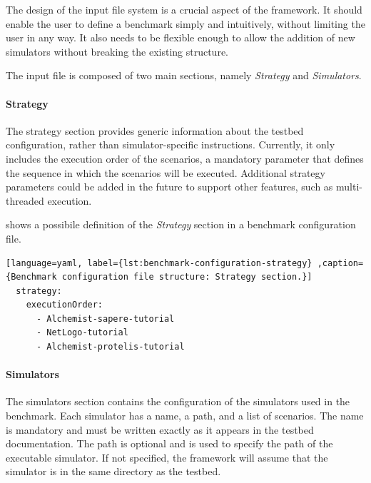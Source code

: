\documentclass[12pt,a4paper,openright,twoside]{book}
\begin{document}
The design of the input file system is a crucial aspect of the framework.
It should enable the user to define a benchmark simply and intuitively, without limiting the user in any way.
It also needs to be flexible enough to allow the addition of new simulators without breaking the existing structure.

The input file is composed of two main sections, namely \emph{Strategy} and \emph{Simulators}.

\paragraph*{Strategy}
The strategy section provides generic information about the testbed configuration, rather than simulator-specific instructions.
Currently, it only includes the execution order of the scenarios, a mandatory parameter that defines the sequence in which the scenarios will be executed.
Additional strategy parameters could be added in the future to support other features, such as multi-threaded execution.

 shows a possibile definition of the \emph{Strategy} section in a benchmark configuration file.

\begin{lstlisting}[language=yaml, label={lst:benchmark-configuration-strategy} ,caption={Benchmark configuration file structure: Strategy section.}]
  strategy:
    executionOrder:
      - Alchemist-sapere-tutorial
      - NetLogo-tutorial
      - Alchemist-protelis-tutorial
\end{lstlisting}

\paragraph*{Simulators}
The simulators section contains the configuration of the simulators used in the benchmark.
Each simulator has a name, a path, and a list of scenarios.
The name is mandatory and must be written exactly as it appears in the testbed documentation.
The path is optional and is used to specify the path of the executable simulator.
If not specified, the framework will assume that the simulator is in the same directory as the testbed.
\end{document}
